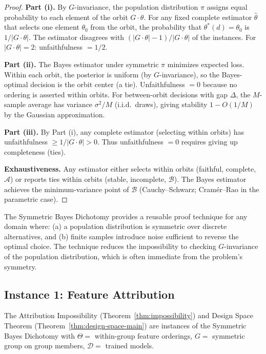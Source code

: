 \documentclass{jmlr}
\begin{document}
\begin{proof}
\textbf{Part (i).} By $G$-invariance, the population distribution $\pi$ assigns equal probability to each element of the orbit $G \cdot \theta$. For any fixed complete estimator $\hat\theta$ that selects one element $\theta_0$ from the orbit, the probability that $\theta^*(d) = \theta_0$ is $1/|G \cdot \theta|$. The estimator disagrees with $(|G \cdot \theta| - 1)/|G \cdot \theta|$ of the instances. For $|G \cdot \theta| = 2$: unfaithfulness $= 1/2$.

\textbf{Part (ii).} The Bayes estimator under symmetric $\pi$ minimizes expected loss. Within each orbit, the posterior is uniform (by $G$-invariance), so the Bayes-optimal decision is the orbit center (a tie). Unfaithfulness $= 0$ because no ordering is asserted within orbits. For between-orbit decisions with gap $\Delta$, the $M$-sample average has variance $\sigma^2/M$ (i.i.d.\ draws), giving stability $1 - O(1/M)$ by the Gaussian approximation.

\textbf{Part (iii).} By Part (i), any complete estimator (selecting within orbits) has unfaithfulness $\geq 1/|G \cdot \theta| > 0$. Thus unfaithfulness $= 0$ requires giving up completeness (ties).

\textbf{Exhaustiveness.} Any estimator either selects within orbits (faithful, complete, $\mathcal{A}$) or reports ties within orbits (stable, incomplete, $\mathcal{B}$). The Bayes estimator achieves the minimum-variance point of $\mathcal{B}$ (Cauchy--Schwarz; Cram\'er--Rao in the parametric case).
\end{proof}

The Symmetric Bayes Dichotomy provides a reusable proof technique for any domain where: (a) a population distribution is symmetric over discrete alternatives, and (b) finite samples introduce noise sufficient to reverse the optimal choice. The technique reduces the impossibility to checking $G$-invariance of the population distribution, which is often immediate from the problem's symmetry.

\subsection{Instance 1: Feature Attribution}

\begin{corollary}
The Attribution Impossibility (Theorem~\ref{thm:impossibility}) and Design Space Theorem (Theorem~\ref{thm:design-space-main}) are instances of the Symmetric Bayes Dichotomy with $\Theta =$ within-group feature orderings, $G =$ symmetric group on group members, $\mathcal{D} =$ trained models.
\end{corollary}
\end{document}
